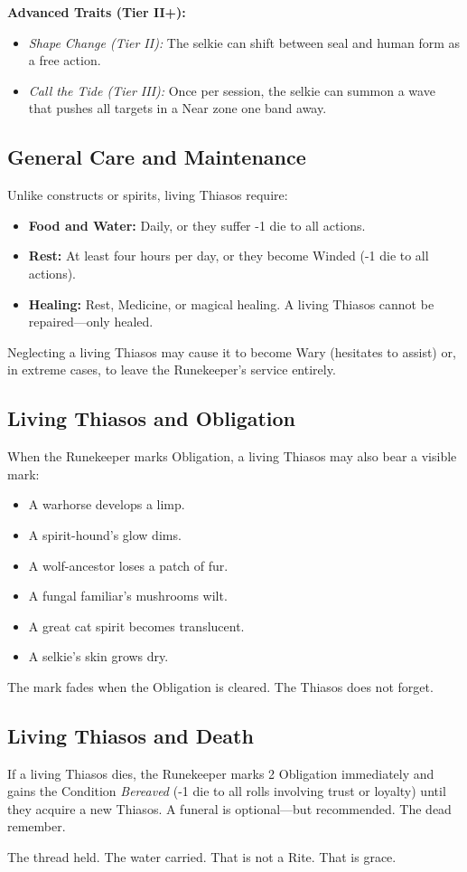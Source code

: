 \noindent\textbf{Advanced Traits (Tier II+):}
\begin{itemize}
\item \textit{Shape Change (Tier II):} The selkie can shift between seal and human form as a free action.
\item \textit{Call the Tide (Tier III):} Once per session, the selkie can summon a wave that pushes all targets in a Near zone one band away.
\end{itemize}

\subsection{General Care and Maintenance}

Unlike constructs or spirits, living Thiasos require:

\begin{itemize}
\item \textbf{Food and Water:} Daily, or they suffer -1 die to all actions.
\item \textbf{Rest:} At least four hours per day, or they become Winded (-1 die to all actions).
\item \textbf{Healing:} Rest, Medicine, or magical healing. A living Thiasos cannot be repaired—only healed.
\end{itemize}

Neglecting a living Thiasos may cause it to become Wary (hesitates to assist) or, in extreme cases, to leave the Runekeeper's service entirely.

\subsection{Living Thiasos and Obligation}

When the Runekeeper marks Obligation, a living Thiasos may also bear a visible mark:

\begin{itemize}
\item A warhorse develops a limp.
\item A spirit-hound's glow dims.
\item A wolf-ancestor loses a patch of fur.
\item A fungal familiar's mushrooms wilt.
\item A great cat spirit becomes translucent.
\item A selkie's skin grows dry.
\end{itemize}

The mark fades when the Obligation is cleared. The Thiasos does not forget.

\subsection{Living Thiasos and Death}

If a living Thiasos dies, the Runekeeper marks 2 Obligation immediately and gains the Condition \textit{Bereaved} (-1 die to all rolls involving trust or loyalty) until they acquire a new Thiasos. A funeral is optional—but recommended. The dead remember.

The thread held. The water carried. That is not a Rite. That is grace.
